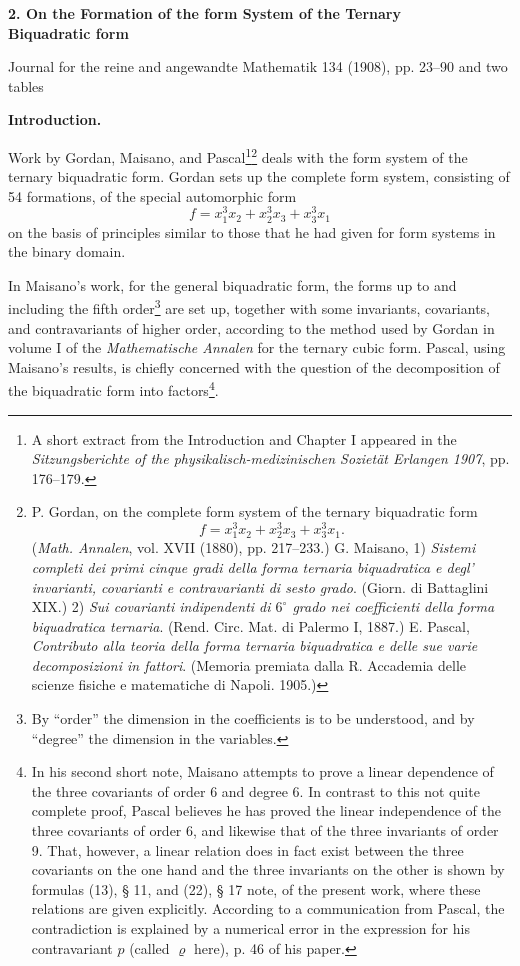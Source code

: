\documentclass[11pt]{article}
\begin{document}
\begin{center}
{\Large\bfseries 2. On the Formation of the form System of the Ternary\\ Biquadratic form}\par
\vspace{1.5em}
Journal for the reine and angewandte Mathematik 134 (1908), pp. 23--90 and two tables
\end{center}

\vspace{3em}

\begin{center}
\textbf{Introduction.}
\end{center}

Work by Gordan, Maisano, and Pascal\footnote{A short extract from the Introduction and Chapter I appeared in the \emph{Sitzungsberichte of the physikalisch-medizinischen Sozietät Erlangen 1907}, pp. 176--179.}\footnote{P. Gordan, on the complete form system of the ternary biquadratic form
\[
f=x_1^3x_2+x_2^3x_3+x_3^3x_1.
\]
(\emph{Math. Annalen}, vol. XVII (1880), pp. 217--233.)
G. Maisano, 1) \emph{Sistemi completi dei primi cinque gradi della forma ternaria biquadratica e degl' invarianti, covarianti e contravarianti di sesto grado}. (Giorn. di Battaglini XIX.)
2) \emph{Sui covarianti indipendenti di $6^\circ$ grado nei coefficienti della forma biquadratica ternaria}. (Rend. Circ. Mat. di Palermo I, 1887.)
E. Pascal, \emph{Contributo alla teoria della forma ternaria biquadratica e delle sue varie decomposizioni in fattori}. (Memoria premiata dalla R. Accademia delle scienze fisiche e matematiche di Napoli. 1905.)} deals with the form system of the ternary biquadratic form. Gordan sets up the complete form system, consisting of 54 formations, of the special automorphic form
\[
f=x_1^3x_2+x_2^3x_3+x_3^3x_1
\]
on the basis of principles similar to those that he had given for form systems in the binary domain.

In Maisano's work, for the general biquadratic form, the forms up to and including the fifth order\footnote{By ``order'' the dimension in the coefficients is to be understood, and by ``degree'' the dimension in the variables.} are set up, together with some invariants, covariants, and contravariants of higher order, according to the method used by Gordan in volume I of the \emph{Mathematische Annalen} for the ternary cubic form. Pascal, using Maisano's results, is chiefly concerned with the question of the decomposition of the biquadratic form into factors\footnote{In his second short note, Maisano attempts to prove a linear dependence of the three covariants of order 6 and degree 6. In contrast to this not quite complete proof, Pascal believes he has proved the linear independence of the three covariants of order 6, and likewise that of the three invariants of order 9. That, however, a linear relation does in fact exist between the three covariants on the one hand and the three invariants on the other is shown by formulas (13), § 11, and (22), § 17 note, of the present work, where these relations are given explicitly. According to a communication from Pascal, the contradiction is explained by a numerical error in the expression for his contravariant $p$ (called $\varrho$ here), p. 46 of his paper.}.
\end{document}
